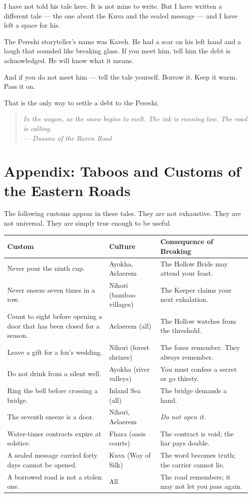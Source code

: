 \documentclass[10pt,twoside]{book}
\newcommand{\dusana}[1]{\begin{quote}\itshape #1 \\ --- Dusana of the Raven Road\end{quote}}
\begin{document}
I have not told his tale here. It is not mine to write. But I have written a different tale --- the one about the Kuva and the sealed message --- and I have left a space for his.

The Pereshi storyteller's name was Kaveh. He had a scar on his left hand and a laugh that sounded like breaking glass. If you meet him, tell him the debt is acknowledged. He will know what it means.

And if you do not meet him --- tell the tale yourself. Borrow it. Keep it warm. Pass it on.

That is the only way to settle a debt to the Pereshi.

\dusana{In the wagon, as the snow begins to melt. The ink is running low. The road is calling.}

\chapter*{Appendix: Taboos and Customs of the Eastern Roads}

The following customs appear in these tales. They are not exhaustive. They are not universal. They are simply true enough to be useful.

\begin{table}[h]
\centering
\begin{tabularx}{\textwidth}{p{4cm} p{4cm} X}
\toprule
\textbf{Custom} & \textbf{Culture} & \textbf{Consequence of Breaking} \\
\midrule
Never pour the ninth cup. & Ayokha, Aelaerem & The Hollow Bride may attend your feast. \\
Never sneeze seven times in a row. & Nihori (bamboo villages) & The Keeper claims your next exhalation. \\
Count to eight before opening a door that has been closed for a season. & Aelaerem (all) & The Hollow watches from the threshold. \\
Leave a gift for a fox's wedding. & Nihori (forest shrines) & The foxes remember. They always remember. \\
Do not drink from a silent well. & Ayokha (river valleys) & You must confess a secret or go thirsty. \\
Ring the bell before crossing a bridge. & Inland Sea (all) & The bridge demands a hand. \\
The seventh sneeze is a door. & Nihori, Aelaerem & \textit{Do not open it.} \\
Water-timer contracts expire at solstice. & Fhara (oasis courts) & The contract is void; the liar pays double. \\
A sealed message carried forty days cannot be opened. & Kuva (Way of Silk) & The word becomes truth; the carrier cannot lie. \\
A borrowed road is not a stolen one. & All & The road remembers; it may not let you pass again. \\
\bottomrule
\end{tabularx}
\end{table}
\end{document}
